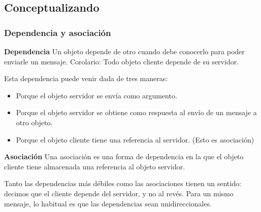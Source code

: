 \documentclass[../main.tex]{subfiles}
\begin{document}
    \subsection{Conceptualizando}
        \subsubsection{Dependencia y asociación}
            \begin{definition} \textbf{Dependencia}
                Un objeto depende de otro cuando debe conocerlo para poder enviarle un mensaje.
                Corolario:
                Todo objeto cliente depende de su servidor.    
            \end{definition}

            Esta dependencia puede venir dada de tres maneras:
            \begin{itemize}
                \item Porque el objeto servidor se envía como argumento.
                \item Porque el objeto servidor se obtiene como respuesta al envío de un mensaje a otro
                objeto.
                \item Porque el objeto cliente tiene una referencia al servidor. (Esto es asociación)
            \end{itemize}        


            \begin{definition} \textbf{Asociación}
                Una asociación es una forma de dependencia en la que el objeto cliente tiene almacenada una referencia al objeto servidor.
                
            \end{definition}

            Tanto las dependencias más débiles como las asociaciones tienen un sentido: decimos que el
            cliente depende del servidor, y no al revés. Para un mismo mensaje, lo habitual es que las
            dependencias sean unidireccionales.
\end{document}
